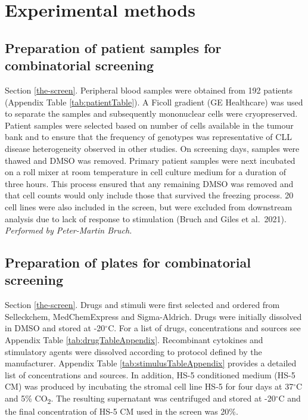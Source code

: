 \documentclass[11pt, a4paper, twosided]{book}
\begin{document}
\hypertarget{experimental-methods}{%
\section{Experimental methods}\label{experimental-methods}}

\hypertarget{prep}{%
\subsection{Preparation of patient samples for combinatorial screening}\label{prep}}

Section \ref{the-screen}. Peripheral blood samples were obtained from 192 patients (Appendix Table \ref{tab:patientTable}). A Ficoll gradient (GE Healthcare) was used to separate the samples and subsequently mononuclear cells were cryopreserved. Patient samples were selected based on number of cells available in the tumour bank and to ensure that the frequency of genotypes was representative of CLL disease heterogeneity observed in other studies. On screening days, samples were thawed and DMSO was removed. Primary patient samples were next incubated on a roll mixer at room temperature in cell culture medium for a duration of three hours. This process ensured that any remaining DMSO was removed and that cell counts would only include those that survived the freezing process. 20 cell lines were also included in the screen, but were excluded from downstream analysis due to lack of response to stimulation (Bruch and Giles et al.~2021). \emph{Performed by Peter-Martin Bruch. }

\hypertarget{plate-prep}{%
\subsection{Preparation of plates for combinatorial screening}\label{plate-prep}}

Section \ref{the-screen}. Drugs and stimuli were first selected and ordered from Selleckchem, MedChemExpress and Sigma-Aldrich. Drugs were initially dissolved in DMSO and stored at -20\(^\circ\)C. For a list of drugs, concentrations and sources see Appendix Table \ref{tab:drugTableAppendix}. Recombinant cytokines and stimulatory agents were dissolved according to protocol defined by the manufacturer. Appendix Table \ref{tab:stimulusTableAppendix} provides a detailed list of concentrations and sources. In addition, HS-5 conditioned medium (HS-5 CM) was produced by incubating the stromal cell line HS-5 for four days at 37\(^\circ\)C and 5\% CO\textsubscript{2}. The resulting supernatant was centrifuged and stored at -20\(^\circ\)C and the final concentration of HS-5 CM used in the screen was 20\%.
\end{document}
